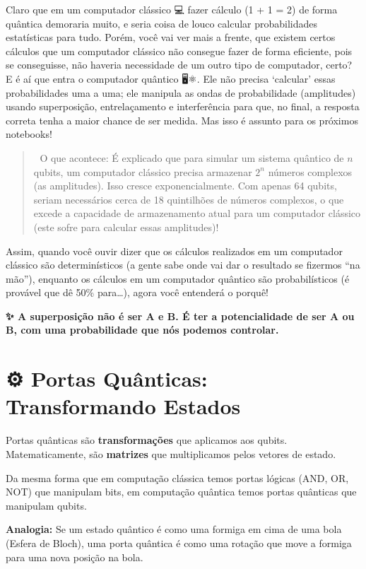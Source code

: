\documentclass[
  brazilian,
]{report}
\begin{document}
Claro que em um computador clássico 💻 fazer cálculo (1 + 1 = 2) de
forma quântica demoraria muito, e seria coisa de louco calcular
probabilidades estatísticas para tudo. Porém, você vai ver mais a
frente, que existem certos cálculos que um computador clássico não
consegue fazer de forma eficiente, pois se conseguisse, não haveria
necessidade de um outro tipo de computador, certo? E é aí que entra o
computador quântico 🖥️⚛️. Ele não precisa `calcular' essas
probabilidades uma a uma; ele manipula as ondas de probabilidade
(amplitudes) usando superposição, entrelaçamento e interferência para
que, no final, a resposta correta tenha a maior chance de ser medida.
Mas isso é assunto para os próximos notebooks!

\begin{quote}
💾 O que acontece: É explicado que para simular um sistema quântico de
\(n\) qubits, um computador clássico precisa armazenar \(2^n\) números
complexos (as amplitudes). Isso cresce exponencialmente. Com apenas 64
qubits, seriam necessários cerca de 18 quintilhões de números complexos,
o que excede a capacidade de armazenamento atual para um computador
clássico (este sofre para calcular essas amplitudes)!
\end{quote}

Assim, quando você ouvir dizer que os cálculos realizados em um
computador clássico são determinísticos (a gente sabe onde vai dar o
resultado se fizermos ``na mão''), enquanto os cálculos em um computador
quântico são probabilísticos (é provável que dê 50\% para\ldots), agora
você entenderá o porquê!

\textbf{✨ A superposição não é ser A e B. É ter a potencialidade de ser
A ou B, com uma probabilidade que nós podemos controlar.}

\section{⚙️ Portas Quânticas: Transformando
Estados}\label{portas-quuxe2nticas-transformando-estados}

Portas quânticas são \textbf{transformações} que aplicamos aos qubits.
Matematicamente, são \textbf{matrizes} que multiplicamos pelos vetores
de estado.

Da mesma forma que em computação clássica temos portas lógicas (AND, OR,
NOT) que manipulam bits, em computação quântica temos portas quânticas
que manipulam qubits.

\textbf{Analogia:} Se um estado quântico é como uma formiga em cima de
uma bola (Esfera de Bloch), uma porta quântica é como uma rotação que
move a formiga para uma nova posição na bola.
\end{document}
